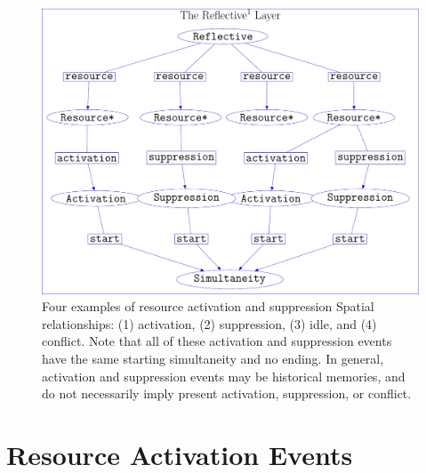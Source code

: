 \begin{figure}
\center
\includegraphics[width=12cm]{gfx/example_resource_conflict}
\caption[Four examples of resource activation and suppression Spatial
  relationships.]{Four examples of resource activation and suppression
  Spatial relationships: (1) activation, (2) suppression, (3) idle,
  and (4) conflict.  Note that all of these activation and suppression
  events have the same starting simultaneity and no ending.  In
  general, activation and suppression events may be historical
  memories, and do not necessarily imply present activation,
  suppression, or conflict.}
\label{figure:example_resource_conflict}
\end{figure}

\section{Resource Activation Events}

